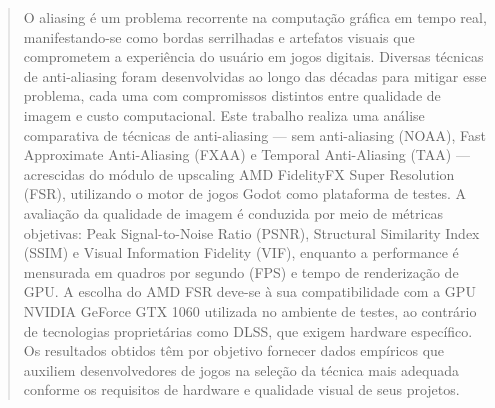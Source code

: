 \documentclass[twoside,english,brazilian]{UNISINOSmonografia}
\begin{document}
\capa
\folhaderosto

\begin{abstract}
O aliasing é um problema recorrente na computação gráfica em tempo real, manifestando-se como bordas serrilhadas e artefatos visuais que comprometem a experiência do usuário em jogos digitais. Diversas técnicas de anti-aliasing foram desenvolvidas ao longo das décadas para mitigar esse problema, cada uma com compromissos distintos entre qualidade de imagem e custo computacional. Este trabalho realiza uma análise comparativa de técnicas de anti-aliasing — sem anti-aliasing (NOAA), Fast Approximate Anti-Aliasing (FXAA) e Temporal Anti-Aliasing (TAA) — acrescidas do módulo de upscaling AMD FidelityFX Super Resolution (FSR), utilizando o motor de jogos Godot como plataforma de testes. A avaliação da qualidade de imagem é conduzida por meio de métricas objetivas: Peak Signal-to-Noise Ratio (PSNR), Structural Similarity Index (SSIM) e Visual Information Fidelity (VIF), enquanto a performance é mensurada em quadros por segundo (FPS) e tempo de renderização de GPU. A escolha do AMD FSR deve-se à sua compatibilidade com a GPU NVIDIA GeForce GTX 1060 utilizada no ambiente de testes, ao contrário de tecnologias proprietárias como DLSS, que exigem hardware específico. Os resultados obtidos têm por objetivo fornecer dados empíricos que auxiliem desenvolvedores de jogos na seleção da técnica mais adequada conforme os requisitos de hardware e qualidade visual de seus projetos.
\end{abstract}
\end{document}
